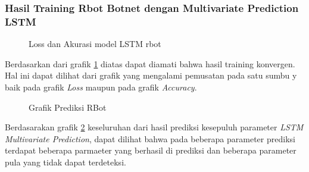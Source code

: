\documentclass[./skripsi.tex]{subfiles}
\begin{document}
\subsubsection{Hasil Training Rbot Botnet dengan Multivariate Prediction LSTM}

\begin{figure}[H]
    \centering
    \caption{Loss dan Akurasi model LSTM rbot}
    \label{fig:lstmm_rbot}
\end{figure}

\par Berdasarkan dari grafik \ref{fig:lstmm_rbot} diatas dapat diamati bahwa hasil training konvergen. Hal ini dapat dilihat dari grafik yang mengalami pemusatan pada satu sumbu y baik pada grafik \textit{Loss} maupun pada grafik \textit{Accuracy}.

\begin{figure}
    \centering
    \caption{Grafik Prediksi RBot}
    \label{fig:lstmm_rbot_pred}
\end{figure}

\par Berdasarakan grafik \ref{fig:lstmm_rbot_pred} keseluruhan dari hasil prediksi kesepuluh parameter \textit{LSTM Multivariate Prediction}, dapat dilihat bahwa pada beberapa parameter prediksi terdapat beberapa parmaeter yang berhasil di prediksi dan beberapa parameter pula yang tidak dapat terdeteksi.
\end{document}
